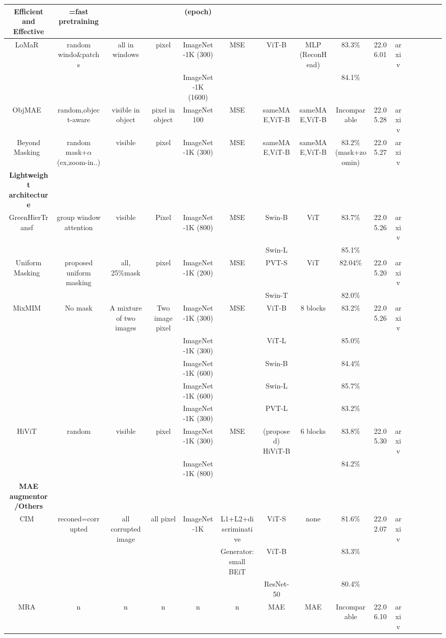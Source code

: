 \documentclass[10pt,journal,compsoc]{IEEEtran}
\begin{document}
\begin{table}[htb]
{\begin{tabular}{cccccccccccccccc}
\hline 
\textbf{Efficient and Effective}  & \textbf{=fast pretraining} &  &  & (epoch) &  & &  &  &  &  \\
\hline 
LoMaR~\cite{chen2022efficient} & random windo\&patchs & all in windows & pixel & ImageNet-1K (300) & MSE & ViT-B & MLP (ReconHead) & 83.3\% & 22.06.01 & arxiv \\ 
& & & & ImageNet-1K (1600) & & & & 84.1\% & & \\ 
\hline 
ObjMAE~\cite{wu2022object} & random,object-aware & visible in object & pixel in object & ImageNet100 & MSE & sameMAE,ViT-B & sameMAE,ViT-B & Incomparable & 22.05.28 & arxiv \\
\hline 
Beyond Masking~\cite{tian2022beyond} & random mask+$\alpha$(ex,zoom-in..) & visible & pixel & ImageNet-1K (300) & MSE & sameMAE,ViT-B & sameMAE,ViT-B & 83.2\%(mask+zoomin) & 22.05.27 & arxiv \\
\hline 
\textbf{Lightweight architecture} \\ 
\hline 
GreenHierTransf~\cite{huang2022green} & group window attention & visible & Pixel & ImageNet-1K (800) & MSE & Swin-B & ViT & 83.7\% & 22.05.26 & arxiv \\
& & & & & & Swin-L & & 85.1\% & & \\ 
\hline 
Uniform Masking~\cite{li2022uniform} & proposed uniform masking & all, 25\%mask & pixel & ImageNet-1K (200) & MSE & PVT-S & ViT & 82.04\% & 22.05.20 & arxiv \\
& & & & & & Swin-T & & 82.0\% & & \\ 
\hline 
MixMIM~\cite{liu2022mixmim} & No mask & A mixture of two images & Two image pixel & ImageNet-1K (300) & MSE & ViT-B & 8 blocks & 83.2\% & 22.05.26 & arxiv \\
& & & & ImageNet-1K (300) & & ViT-L & & 85.0\% & & \\ 
& & & & ImageNet-1K (600) & & Swin-B & & 84.4\% & & \\ 
& & & & ImageNet-1K (600) & & Swin-L & & 85.7\% & & \\ 
& & & & ImageNet-1K (300) & & PVT-L & & 83.2\% & & \\ 
\hline 
HiViT~\cite{zhang2022hivit} & random & visible & pixel & ImageNet-1K (300) & MSE & (proposed) HiViT-B & 6 blocks & 83.8\% & 22.05.30 & arxiv \\
& & & & ImageNet-1K (800) & & & & 84.2\% & & \\ 

\hline 
\textbf{MAE augmentor/Others} \\ 
\hline 
CIM~\cite{fang2022corrupted} & reconed=corrupted & all corrupted image & all pixel & ImageNet-1K & L1+L2+discriminative & ViT-S & none & 81.6\% & 22.02.07 & arxiv \\
& & & & & Generator: small BEiT & ViT-B & & 83.3\% & & \\ 
& & & & & & ResNet-50 & & 80.4\% & & \\ 
\hline 
MRA~\cite{xu2022masked} & n & n & n & n & n & MAE & MAE & Incomparable & 22.06.10 & arxiv \\


\end{tabular}}
\end{table}
\end{document}

